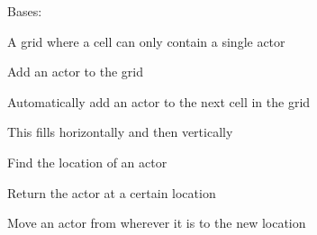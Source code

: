 \documentclass[letterpaper,10pt,english]{sphinxmanual}
\begin{document}

\begin{fulllineitems}
\label{blocks:serge.blocks.layout.Grid}
Bases: {\hyperref[blocks:serge.blocks.layout.BaseGrid]{}}

A grid where a cell can only contain a single actor

\begin{fulllineitems}
\label{blocks:serge.blocks.layout.Grid.addActor}
Add an actor to the grid

\end{fulllineitems}


\begin{fulllineitems}
\label{blocks:serge.blocks.layout.Grid.autoAddActor}
Automatically add an actor to the next cell in the grid

This fills horizontally and then vertically

\end{fulllineitems}


\begin{fulllineitems}
\label{blocks:serge.blocks.layout.Grid.findActorLocation}
Find the location of an actor

\end{fulllineitems}


\begin{fulllineitems}
\label{blocks:serge.blocks.layout.Grid.getActorAt}
Return the actor at a certain location

\end{fulllineitems}


\begin{fulllineitems}
\label{blocks:serge.blocks.layout.Grid.moveActor}
Move an actor from wherever it is to the new location

\end{fulllineitems}


\end{fulllineitems}
\end{document}
